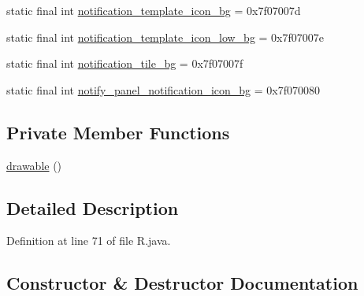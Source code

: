 \begin{DoxyCompactItemize}
\item 
static final int \mbox{\hyperlink{classandroid_1_1support_1_1graphics_1_1drawable_1_1animated_1_1_r_1_1drawable_a47d89cad868f73d03a6a6f09466f7757}{notification\+\_\+template\+\_\+icon\+\_\+bg}} = 0x7f07007d
\item 
static final int \mbox{\hyperlink{classandroid_1_1support_1_1graphics_1_1drawable_1_1animated_1_1_r_1_1drawable_a7338e51e18b9d094b0084c7844db9876}{notification\+\_\+template\+\_\+icon\+\_\+low\+\_\+bg}} = 0x7f07007e
\item 
static final int \mbox{\hyperlink{classandroid_1_1support_1_1graphics_1_1drawable_1_1animated_1_1_r_1_1drawable_a4953f710df010071750b666cb85788fa}{notification\+\_\+tile\+\_\+bg}} = 0x7f07007f
\item 
static final int \mbox{\hyperlink{classandroid_1_1support_1_1graphics_1_1drawable_1_1animated_1_1_r_1_1drawable_afd5a7eb941d015ffa1256e11549c45e1}{notify\+\_\+panel\+\_\+notification\+\_\+icon\+\_\+bg}} = 0x7f070080
\end{DoxyCompactItemize}
\subsection*{Private Member Functions}
\begin{DoxyCompactItemize}
\item 
\mbox{\hyperlink{classandroid_1_1support_1_1graphics_1_1drawable_1_1animated_1_1_r_1_1drawable_a4211c749597c81b717eb261cd208dc47}{drawable}} ()
\end{DoxyCompactItemize}


\subsection{Detailed Description}


Definition at line 71 of file R.\+java.



\subsection{Constructor \& Destructor Documentation}
\mbox{\label{classandroid_1_1support_1_1graphics_1_1drawable_1_1animated_1_1_r_1_1drawable_a4211c749597c81b717eb261cd208dc47}} 
